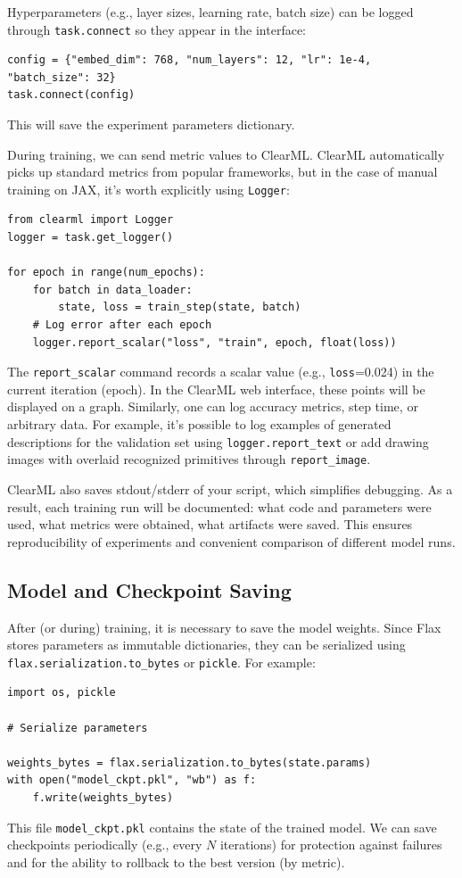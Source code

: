 \documentclass{article}
\begin{document}
Hyperparameters (e.g., layer sizes, learning rate, batch size) can be logged through \texttt{task.connect} so they appear in the interface:
\begin{lstlisting}
config = {"embed_dim": 768, "num_layers": 12, "lr": 1e-4, "batch_size": 32}
task.connect(config)
\end{lstlisting}
This will save the experiment parameters dictionary.

During training, we can send metric values to ClearML. ClearML automatically picks up standard metrics from popular frameworks, but in the case of manual training on JAX, it's worth explicitly using \texttt{Logger}:
\begin{lstlisting}
from clearml import Logger
logger = task.get_logger()

for epoch in range(num_epochs):
    for batch in data_loader:
        state, loss = train_step(state, batch)
    # Log error after each epoch
    logger.report_scalar("loss", "train", epoch, float(loss))
\end{lstlisting}
The \texttt{report_scalar} command records a scalar value (e.g., \texttt{loss}=0.024) in the current iteration (epoch). In the ClearML web interface, these points will be displayed on a graph. Similarly, one can log accuracy metrics, step time, or arbitrary data. For example, it's possible to log examples of generated descriptions for the validation set using \texttt{logger.report_text} or add drawing images with overlaid recognized primitives through \texttt{report_image}.

ClearML also saves stdout/stderr of your script, which simplifies debugging. As a result, each training run will be documented: what code and parameters were used, what metrics were obtained, what artifacts were saved. This ensures reproducibility of experiments and convenient comparison of different model runs.

\subsection{Model and Checkpoint Saving}

After (or during) training, it is necessary to save the model weights. Since Flax stores parameters as immutable dictionaries, they can be serialized using \texttt{flax.serialization.to_bytes} or \texttt{pickle}. For example:
\begin{lstlisting}
import os, pickle

# Serialize parameters

weights_bytes = flax.serialization.to_bytes(state.params)
with open("model_ckpt.pkl", "wb") as f:
    f.write(weights_bytes)
\end{lstlisting}
This file \texttt{model_ckpt.pkl} contains the state of the trained model. We can save checkpoints periodically (e.g., every $N$ iterations) for protection against failures and for the ability to rollback to the best version (by metric).
\end{document}
